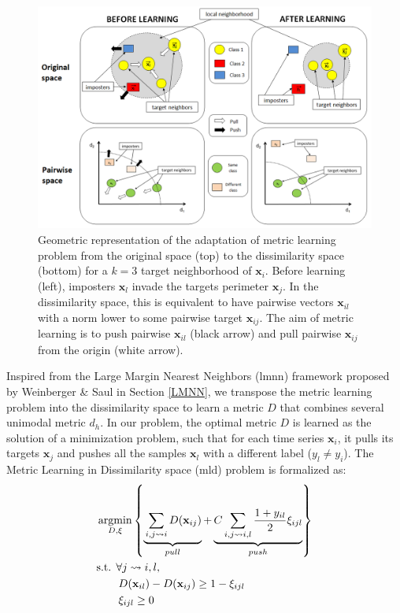 \begin{figure}[h!]
	\centering
	\includegraphics[width=0.9\linewidth]{images/Transposition_Pairwise}
	\caption{Geometric representation of the adaptation of metric learning problem from the original space (top) to the dissimilarity space (bottom) for a $k=3$ target neighborhood of $\textbf{x}_i$. Before learning (left), imposters $\textbf{x}_l$ invade the targets perimeter $\textbf{x}_j$. In the dissimilarity space, this is equivalent to have pairwise vectors $\textbf{x}_{il}$ with a norm lower to some pairwise target $\textbf{x}_{ij}$. The aim of metric learning is to push pairwise $\textbf{x}_{il}$ (black arrow) and pull pairwise $\textbf{x}_{ij}$ from the origin (white arrow).}
	\label{fig:Transposition_Pairwise}
\end{figure}

Inspired from the Large Margin Nearest Neighbors ({\sc lmnn}) framework proposed by Weinberger \& Saul in Section \ref{LMNN}, we transpose the metric learning problem into the dissimilarity space to learn a metric $D$ that combines several unimodal metric $d_h$. In our problem, the optimal metric $D$ is learned as the solution of a minimization problem, such that for each time series $\textbf{x}_i$, it pulls its targets $\textbf{x}_j$ and pushes all the samples $\textbf{x}_l$ with a different label ($y_l \neq y_i$). The Metric Learning in Dissimilarity space ({\sc mld}) problem is formalized as:
\begin{align}
	&\displaystyle 		\argmin_{D,\xi} \left\lbrace \underbrace{
		\vphantom{ \sum\limits_{i,j \rightsquigarrow i,l} \frac{1+y_{il}}{2} \xi_{ijl} }
		\sum_{i,j\rightsquigarrow i}D(\textbf{x}_{ij})
	}_{pull}
	+
	\underbrace{
		C\sum\limits_{i,j \rightsquigarrow i,l} \frac{1+y_{il}}{2} \xi_{ijl}
	}
	_{push} \right\rbrace  \label{eq:OriginalOptimizationProblem_Objective} \\
	&\text{s.t.  } \forall j \rightsquigarrow i, l, \nonumber \\
	& \qquad D(\textbf{x}_{il})-D(\textbf{x}_{ij}) \geq 1-\xi_{ijl} \label{eq:OriginalOptimizationProblem2}\\
	& \qquad \xi_{ijl} \geq 0 
	\label{eq:OriginalOptimizationProblem} 
\end{align}

